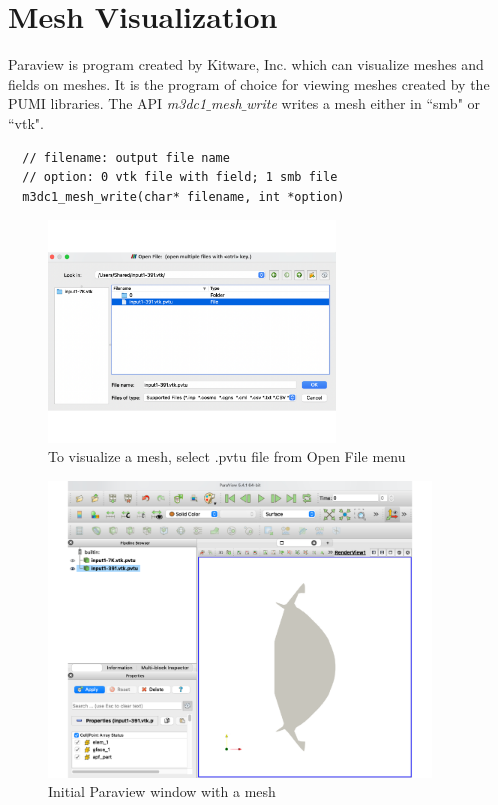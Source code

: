 
\section{Mesh Visualization}
\label{ch:app-paraview}

Paraview is program created by Kitware, Inc. which can visualize meshes
and fields on meshes.
It is the program of choice for viewing meshes created by the PUMI libraries.
The API \emph{m3dc1$\_$mesh$\_$write} writes a mesh either in ``smb" or ``vtk".

\begin{verbatim}
  // filename: output file name
  // option: 0 vtk file with field; 1 smb file
  m3dc1_mesh_write(char* filename, int *option)
\end{verbatim}\vspace{-.5cm}\hspace{1cm}

\begin{figure}
\centering
\includegraphics[width=3in]{./figures/paraview-fig1.pdf}
\caption{To visualize a mesh, select .pvtu file from Open File menu}
\label{fig:paraview-1}
\end{figure}

\begin{figure}
\centering
\includegraphics[width=4in]{./figures/paraview-fig2.pdf}
\caption{Initial Paraview window with a mesh}
\label{fig:paraview-2}
\end{figure}

